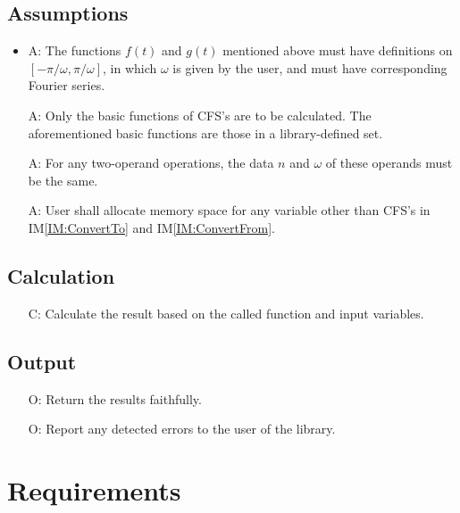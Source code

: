 \documentclass[12pt]{article}
\newcounter{assumpnum} %
\newcounter{calnum} %
\newcounter{outputnum} %
\newcommand{\iref}[1]{IM\ref{#1}}
\begin{document}
\subsection{Assumptions}
\newcommand{\aitem}[1]{\item[A\refstepcounter{assumpnum}\theassumpnum \label{Ass:#1}:] }
\begin{itemize}

\aitem{FunctionProperty}
The functions $f(t)$ and $g(t)$ mentioned above must have definitions on 
$[-\pi/\omega, \pi/\omega]$, in which $\omega$ is given by the user, 
and must have corresponding Fourier series.
\item[A\refstepcounter{assumpnum}\theassumpnum \label{Ass:BasicFunction}:] 
Only the basic functions of CFS's are to be calculated. The aforementioned 
basic functions are those in a library-defined set.
\item[A\refstepcounter{assumpnum}\theassumpnum \label{Ass:CFSPropertyMatch}:] 
For any two-operand operations, the data $n$ and $\omega$ of these operands 
must be the same. 
\item[A\refstepcounter{assumpnum}\theassumpnum \label{Ass:Memory}:] 
User shall allocate memory space for any variable other than 
CFS's in \iref{IM:ConvertTo} and \iref{IM:ConvertFrom}.
\end{itemize}

\subsection{Calculation} \label{sec_Calculation}
\begin{itemize}
\item[C\refstepcounter{calnum}\thecalnum \label{Cal:Normal}:] 
Calculate the result based on the called function and input variables.

\end{itemize}
\subsection{Output} \label{sec_Output}    
\begin{itemize}
\item[O\refstepcounter{outputnum}\theoutputnum \label{Output:Faithful}:] 
Return the results faithfully.
\item[O\refstepcounter{outputnum}\theoutputnum \label{Output:Error}:] 
Report any detected errors to the user of the library.
\end{itemize}
\section{Requirements}\label{Sc:Req}
\end{document}
